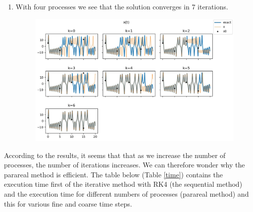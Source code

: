 \begin{enumerate}[label=\textbullet]
\begin{figure}[H]
		\label{lorenz:3}
	\end{figure}
\newpage
	\item With four processes we see that the solution converges in 7 iterations.
	\begin{figure}[H]       
		\centering
		\includegraphics[width=0.9\linewidth]{"images/parareal/lorenz_4p.jpg"}
		\label{lorenz:4}
	\end{figure}

\end{enumerate}

\noindent According to the results, it seems that that as we increase the number of processes, the number of iterations increases. We can therefore wonder why the parareal method is efficient. The table below (Table \ref{time})  contains the execution time first of the iterative method with RK4 (the sequential method) and the execution time for different numbers of processes (parareal method) and this for various fine and coarse time steps.

